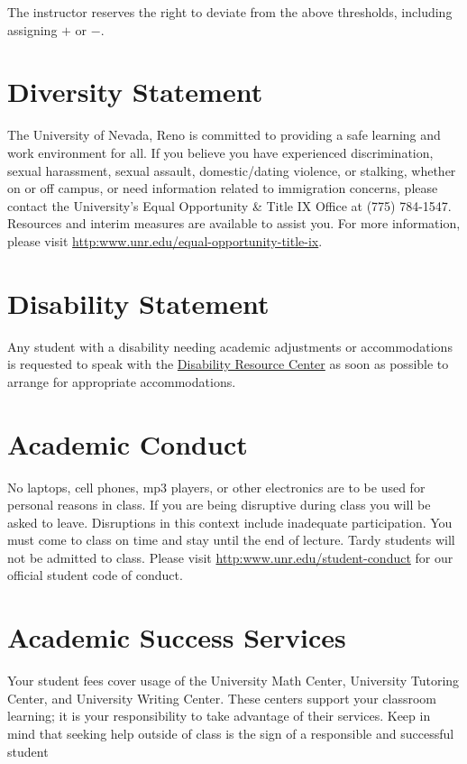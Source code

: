\documentclass[11pt,onecolumn]{article}
\begin{document}
The instructor reserves the right to deviate from the above thresholds, including assigning $+$ or $-$.

\section*{Diversity Statement}
The University of Nevada, Reno is committed to providing a safe learning and work environment for all. If you believe you have experienced discrimination, sexual harassment, sexual assault, domestic/dating violence, or stalking, whether on or off campus, or need information related to immigration concerns, please contact the University’s Equal Opportunity \& Title IX Office at (775) 784-1547. Resources and interim measures are available to assist you. For more information, please visit \url{http:www.unr.edu/equal-opportunity-title-ix}.

\section*{Disability Statement}
Any student with a disability needing academic adjustments or accommodations is requested to speak with the \href{http:www.unr.edu/drc}{Disability Resource Center} as soon as possible to arrange for appropriate accommodations.

\section*{Academic Conduct}
No laptops, cell phones, mp3 players, or other electronics are to be used for personal reasons in class. If you are being disruptive during class you will be asked to leave. Disruptions in this context include inadequate participation. You must come to class on time and stay until the end of lecture. Tardy students will not be admitted to class. Please visit \url{http:www.unr.edu/student-conduct} for our official student code of conduct.

\section*{Academic Success Services}
Your student fees cover usage of the University Math Center, University Tutoring Center, and University Writing Center. These centers support your classroom learning; it is your responsibility to take advantage of their services. Keep in mind that seeking help outside of class is the sign of a responsible and successful student
\end{document}
